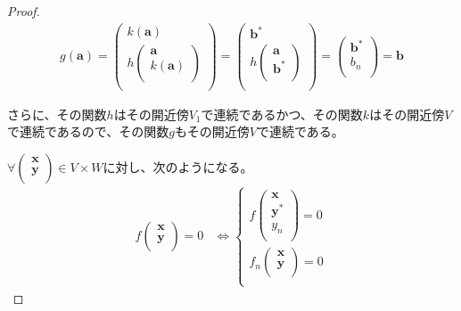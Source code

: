 \documentclass[dvipdfmx]{jsarticle}
\begin{document}
\begin{proof}
\begin{align*}
g\left( \mathbf{a} \right) = \begin{pmatrix}
k\left( \mathbf{a} \right) \\
h\begin{pmatrix}
\mathbf{a} \\
k\left( \mathbf{a} \right) \\
\end{pmatrix} \\
\end{pmatrix} = \begin{pmatrix}
\mathbf{b}^{*} \\
h\begin{pmatrix}
\mathbf{a} \\
\mathbf{b}^{*} \\
\end{pmatrix} \\
\end{pmatrix} = \begin{pmatrix}
\mathbf{b}^{*} \\
b_{n} \\
\end{pmatrix} = \mathbf{b}
\end{align*}\par
さらに、その関数$h$はその開近傍$V_{1}$で連続であるかつ、その関数$k$はその開近傍$V$で連続であるので、その関数$g$もその開近傍$V$で連続である。\par
$\forall\begin{pmatrix}
\mathbf{x} \\
\mathbf{y} \\
\end{pmatrix} \in V \times W$に対し、次のようになる。
\begin{align*}
f\begin{pmatrix}
\mathbf{x} \\
\mathbf{y} \\
\end{pmatrix} = 0 &\Leftrightarrow \left\{ \begin{matrix}
f\begin{pmatrix}
\mathbf{x} \\
\mathbf{y}^{*} \\
y_{n} \\
\end{pmatrix} = 0 \\
f_{n}\begin{pmatrix}
\mathbf{x} \\
\mathbf{y} \\
\end{pmatrix} = 0 \\

\end{matrix}
\end{align*}
\end{proof}
\end{document}
